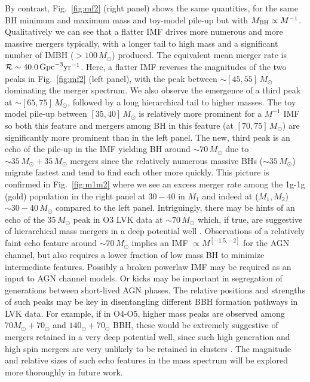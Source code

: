 By contrast, Fig.~\ref{fig:mf2} (right panel) shows the same quantities, for the same BH minimum and maximum mass and toy-model pile-up but with $M_{\rm BH} \propto M^{-1}$. Qualitatively we can see that a flatter IMF drives more numerous and more massive mergers typically, with a longer tail to high mass and a significant number of IMBH ($>100\,M_{\odot}$) produced. The equivalent mean merger rate is $\mathcal{R}\sim 40.0\,{\rm Gpc}^{-3}{\rm yr}^{-1}$. Here, a flatter IMF reverses the magnitudes of the two peaks in Fig.~\ref{fig:mf2} (left panel), with the peak between $\sim [45,55]\,M_{\odot}$ dominating the merger spectrum. We also observe the emergence of a third peak at $\sim [65,75]\,M_{\odot}$, followed by a long hierarchical tail to higher masses. The toy model pile-up between $[35,40]\,M_{\odot}$ is relatively more prominent for a $M^{-1}$ IMF so both this feature and mergers among BH in this feature (at $[70,75]\,M_{\odot}$) are significantly more prominent than in the left panel. The new, third peak is an echo of the pile-up in the IMF yielding BH around $\sim 70\,M_{\odot}$ due to $\sim 35\,M_{\odot}+35\,M_{\odot}$ mergers since the relatively numerous massive BHs ($\sim 35\,M_{\odot}$) migrate fastest and tend to find each other more quickly. This picture is confirmed in Fig.~\ref{fig:m1m2} where we see an excess merger rate among the 1g-1g (gold) population in the right panel at $30-40$ in $M_{1}$ and indeed at ($M_{1},M_{2}$)$\sim 30-40\,M_{\odot}$ compared to the left panel. Intriguingly, there may be hints of an echo of the $35\,M_{\odot}$ peak in O3 LVK data at $\sim 70\,M_{\odot}$ which, if true, are suggestive of hierarchical mass mergers in a deep potential well \citep{Ignacio24}.  Observations of a relatively faint echo feature around $\sim 70\,M_{\odot}$ implies an IMF $\propto M^{[-1.5,-2]}$ for the AGN channel, but also requires a lower fraction of low mass BH to minimize intermediate features. Possibly a broken powerlaw IMF may be required as an input to AGN channel models. Or kicks may be important in segregation of generations between short-lived AGN phases. The relative positions and strengths of such peaks may be key in disentangling different BBH formation pathways in LVK data. For example, if in O4-O5, higher mass peaks are observed among $70M_{\odot}+70_{\odot}$ and $140_{\odot}+70_{\odot}$ BBH, these would be extremely suggestive of mergers retained in a very deep potential well, since such high generation and high spin mergers are very unlikely to be retained in clusters \citep[see also][]{FordMcKernan25}. The magnitude and relative sizes of such echo features in the mass spectrum will be explored more thoroughly in future work. 

